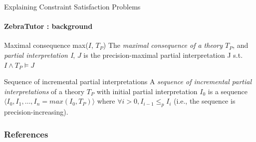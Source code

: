 \documentclass{beamer}
\newcommand\m[1]{\ensuremath{#1}\xspace}
\newcommand\allconstraints{\m{T_P}}
\begin{document}
\begin{frame}{\small{Explaining Constraint Satisfaction Problems}}
    \framesubtitle{ZebraTutor : background}


    \begin{block}{Maximal consequence max($I$, $\allconstraints$)}
        The \textit{maximal consequence  of a theory $\allconstraints$}, and \textit{partial interpretation I},  $J$ is the precision-maximal partial interpretation J s.t. $I \wedge \allconstraints \models J$
    \end{block}

    \begin{block}{Sequence of incremental partial interpretations}
        A \textit{sequence of incremental partial interpretations} of a theory $\allconstraints$ with initial partial interpretation $I_0$ is a sequence $\langle I_0, I_1, \ldots, I_n  = max(I_0,\allconstraints)\rangle$ where $\forall i>0, I_{i-1} \leq_p I_{i}$ (i.e., the sequence is precision-increasing).
    \end{block}
    
\end{frame}












\begin{frame}
    \frametitle{References}
    \vspace{2em}
    
\end{frame}
\end{document}
